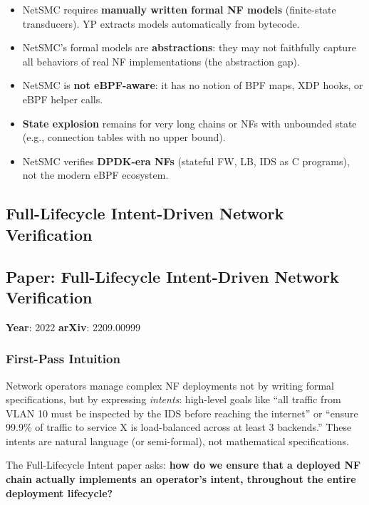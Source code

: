\begin{limitbox}
\begin{itemize}
  \item NetSMC requires \textbf{manually written formal NF models} (finite-state transducers). YP extracts models automatically from bytecode.
  \item NetSMC's formal models are \textbf{abstractions}: they may not faithfully capture all behaviors of real NF implementations (the abstraction gap).
  \item NetSMC is \textbf{not eBPF-aware}: it has no notion of BPF maps, XDP hooks, or eBPF helper calls.
  \item \textbf{State explosion} remains for very long chains or NFs with unbounded state (e.g., connection tables with no upper bound).
  \item NetSMC verifies \textbf{DPDK-era NFs} (stateful FW, LB, IDS as C programs), not the modern eBPF ecosystem.
\end{itemize}
\end{limitbox}

\subsection{Full-Lifecycle Intent-Driven Network Verification}

\subsection*{Paper: Full-Lifecycle Intent-Driven Network Verification}
\textbf{Year}: 2022 \quad \textbf{arXiv}: 2209.00999

\subsubsection{First-Pass Intuition}

Network operators manage complex NF deployments not by writing formal specifications, but by expressing \emph{intents}: high-level goals like ``all traffic from VLAN 10 must be inspected by the IDS before reaching the internet'' or ``ensure 99.9\% of traffic to service X is load-balanced across at least 3 backends.'' These intents are natural language (or semi-formal), not mathematical specifications.

The Full-Lifecycle Intent paper asks: \textbf{how do we ensure that a deployed NF chain actually implements an operator's intent, throughout the entire deployment lifecycle?}


